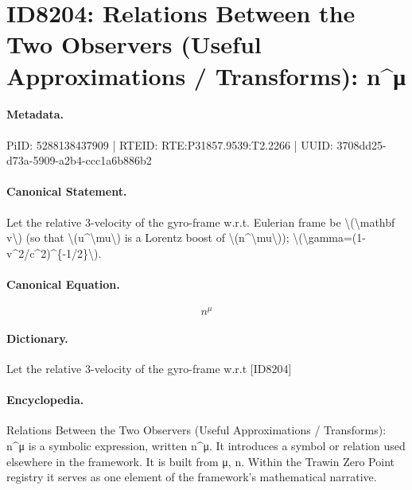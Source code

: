 \section*{ID8204: Relations Between the Two Observers (Useful Approximations / Transforms): n\textasciicircum{}μ}
\paragraph{Metadata.}
PiID: 5288138437909 | RTEID: RTE:P31857.9539:T2.2266 | UUID: 3708dd25-d73a-5909-a2b4-ccc1a6b886b2

\paragraph{Canonical Statement.}
Let the relative 3-velocity of the gyro-frame w.r.t. Eulerian frame be \textbackslash{}(\textbackslash{}mathbf v\textbackslash{}) (so that \textbackslash{}(u\textasciicircum{}\textbackslash{}mu\textbackslash{}) is a Lorentz boost of \textbackslash{}(n\textasciicircum{}\textbackslash{}mu\textbackslash{})); \textbackslash{}(\textbackslash{}gamma=(1-v\textasciicircum{}2/c\textasciicircum{}2)\textasciicircum{}\{-1/2\}\textbackslash{}).

\paragraph{Canonical Equation.}
\[
n^\mu
\]

\paragraph{Dictionary.}
Let the relative 3-velocity of the gyro-frame w.r.t [ID8204]

\paragraph{Encyclopedia.}
Relations Between the Two Observers (Useful Approximations / Transforms): n\textasciicircum{}μ is a symbolic expression, written n\textasciicircum{}μ. It introduces a symbol or relation used elsewhere in the framework. It is built from μ, n. Within the Trawin Zero Point registry it serves as one element of the framework's mathematical narrative.
